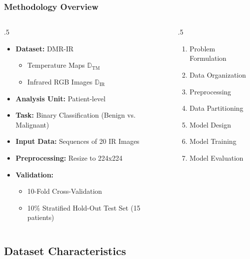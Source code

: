 \documentclass{beamer}
\begin{document}
\begin{frame}
  \frametitle{Methodology Overview}
\begin{columns}
  \begin{column}{.5\textwidth}
  \begin{itemize}
\item \textbf{Dataset:} DMR-IR
  \begin{itemize}
  \item Temperature Maps $\mathbb{D}_{\mathrm{TM}}$
  \item Infrared RGB Images $\mathbb{D}_{\mathrm{IR}}$
  \end{itemize}
        \item \textbf{Analysis Unit:} Patient-level
        \item \textbf{Task:} Binary Classification (Benign vs. Malignant)
        \item \textbf{Input Data:} Sequences of 20 \ac{IR} Images
        \item \textbf{Preprocessing:} Resize to 224x224
        \item \textbf{Validation:}
        \begin{itemize}
            \item 10-Fold Cross-Validation
            \item 10\% Stratified Hold-Out Test Set (15 patients)
        \end{itemize}
      \end{itemize}    
  \end{column}

  \begin{column}{.5\textwidth}
\begin{enumerate}
\item Problem Formulation
\item Data Organization
\item Preprocessing
\item Data Partitioning
\item Model Design
\item Model Training
\item Model Evaluation
\end{enumerate}
  \end{column}
\end{columns}

\end{frame}

\subsection{Dataset Characteristics}
\end{document}
